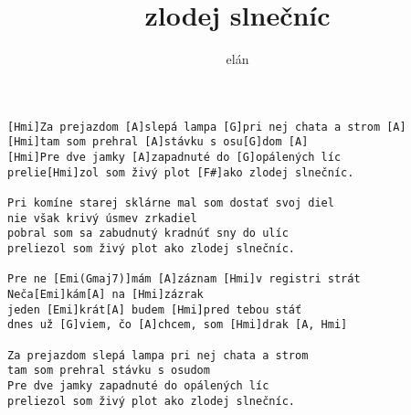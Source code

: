 \author{elán}
\title{zlodej slnečníc}
\maketitle
\begin{verbatim}
[Hmi]Za prejazdom [A]slepá lampa [G]pri nej chata a strom [A]
[Hmi]tam som prehral [A]stávku s osu[G]dom [A]
[Hmi]Pre dve jamky [A]zapadnuté do [G]opálených líc 
prelie[Hmi]zol som živý plot [F#]ako zlodej slnečníc. 

Pri komíne starej sklárne mal som dostať svoj diel 
nie však krivý úsmev zrkadiel 
pobral som sa zabudnutý kradnúť sny do ulíc 
preliezol som živý plot ako zlodej slnečníc. 

Pre ne [Emi(Gmaj7)]mám [A]záznam [Hmi]v registri strát 
Neča[Emi]kám[A] na [Hmi]zázrak 
jeden [Emi]krát[A] budem [Hmi]pred tebou stáť 
dnes už [G]viem, čo [A]chcem, som [Hmi]drak [A, Hmi]

Za prejazdom slepá lampa pri nej chata a strom 
tam som prehral stávku s osudom 
Pre dve jamky zapadnuté do opálených líc 
preliezol som živý plot ako zlodej slnečníc. 

\end{verbatim}
